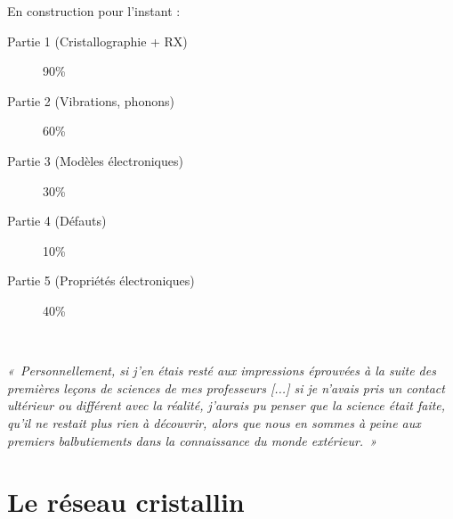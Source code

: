 \documentclass[a4paper,justified,twoside,nobib]{tufte-book}
\renewcommand{\=}[1]{\stackrel{#1}{=}} %
\begin{document}
    \vspace{2cm}
    
En construction pour l'instant :
\begin{description}
    \item[Partie 1 (Cristallographie + RX)] 90\%
    \item[Partie 2 (Vibrations, phonons)] 60\%
    \item[Partie 3 (Modèles électroniques)] 30\%
    \item[Partie 4 (Défauts)] 10\%
    \item[Partie 5 (Propriétés électroniques)] 40\%
\end{description}




\tableofcontents\thispagestyle{empty}



\cleardoublepage
~\vfill
\begin{doublespace}
\noindent\fontsize{18
}{22}\selectfont\itshape
\nohyphenation
«~Personnellement, si j'en étais resté aux impressions éprouvées à la suite des 
premières leçons de sciences de mes professeurs [...] si je n'avais pris un
contact ultérieur ou différent avec la réalité, j'aurais pu penser que la 
science était faite, qu'il ne restait plus rien à découvrir, alors que nous en 
sommes à peine aux premiers balbutiements dans la connaissance du monde 
extérieur.~»\\

\end{doublespace}
\vfill
\vfill

\mainmatter

\part[LE RÉSEAU CRISTALLIN]{Le réseau cristallin}
\end{document}
